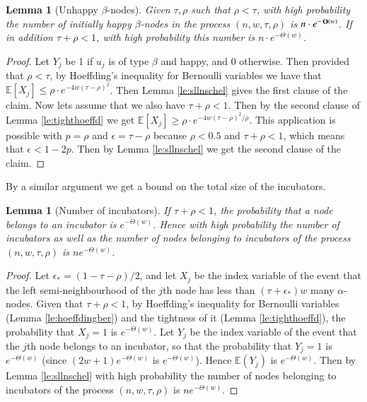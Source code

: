 \documentclass[11pt]{article}
\theoremstyle{plain}
\newtheorem{lem}[thm]{Lemma}
\numberwithin{equation}{subsection}
\newcommand{\bigo}[1]{\mathop{\bf O}\/\left({#1}\right)}
\DeclareRobustCommand{\expe}[2][{\mbox{$\mathbb{E}$}}]{\ensuremath {#1}\left[ {#2} \right]}
\begin{document}
\begin{lem}[Unhappy $\beta$-nodes]\label{prop:bougreenuninit}\label{prop:bforbetainit}
Given $\tau,\rho$ such that $\rho <\tau$,
with high probability 
 the number of initially happy $\beta$-nodes in the process  
$(n,w,\tau,\rho)$ is $n\cdot  e^{-\bigo{w}}$.
If in addition $\tau+\rho<1$,
with high probability 
this number is $n\cdot  e^{-\Theta(w)}$.
\end{lem}
\begin{proof}
Let $Y_j$ be 1 if $u_j$ is of type $\beta$ and happy, and 0 otherwise.
Then provided that $\rho <\tau$, by Hoeffding's inequality for Bernoulli variables
we have that $\expe{X_j}\leq \rho\cdot  e^{-4w(\tau-\rho)^2}$.
Then Lemma \ref{le:sllnschel} gives the first clause of the claim.
Now lets assume that we also have $\tau+\rho<1$.
Then by the second clause of Lemma \ref{le:tighthoeffd} 
we get $\expe{X_j}\geq  \rho \cdot  e^{-4w(\tau-\rho)^2/\rho}$.
This application is possible with $p=\rho$ and $\epsilon =\tau-\rho$ because
$\rho<0.5$ and $\tau+\rho<1$, which means that $\epsilon <1-2p$.
Then by Lemma \ref{le:sllnschel} 
we get the second clause of the claim.
\end{proof}

By a similar argument we get a bound on the total size of the incubators.

\begin{lem}[Number of incubators]\label{prop:blacksitesbou}
If $\tau+\rho<1$, the probability that a node belongs to an incubator is
$e^{-\Theta(w)}$.
Hence with high probability  
 the number of incubators as well as the number of nodes belonging to incubators
 of the process $(n,w,\tau,\rho)$ is 
$n e^{-\Theta(w)}$.
\end{lem}
\begin{proof}
Let $\epsilon_{\ast}=(1-\tau-\rho)/2$, and let
$X_j$ be the index variable of the event that
the left semi-neighbourhood of the 
$j$th node has less than $(\tau+\epsilon_{\ast})w$ many
$\alpha$-nodes. 
Given that $\tau+\rho<1$, by Hoeffding's inequality
for Bernoulli variables (Lemma \ref{le:hoeffdingber}) and the
tightness of it (Lemma \ref{le:tighthoeffd}),
the probability that $X_j=1$
is $e^{-\Theta(w)}$.
Let $Y_j$ be the index variable of the 
event that the $j$th node belongs to
an incubator, so that the probability that 
$Y_j=1$ is $e^{-\Theta(w)}$ (since $(2w+1)e^{-\Theta(w)}$ is
$e^{-\Theta(w)}$).
Hence $\mathbb{E}(Y_j)$ is  $e^{-\Theta(w)}$.
Then by Lemma \ref{le:sllnschel}
with high probability 
 the number of nodes belonging to incubators
 of the process $(n,w,\tau,\rho)$ is 
$n e^{-\Theta(w)}$.
\end{proof}
\end{document}
